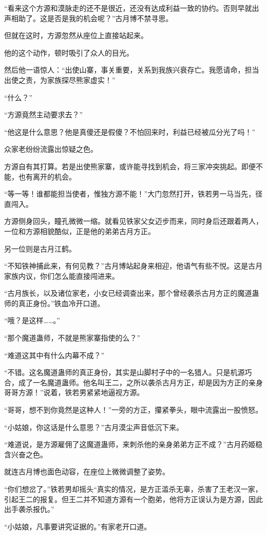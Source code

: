 \begin{this_body}
“看来这个方源和漠脉走的还不是很近，还没有达成利益一致的协约。否则早就出声相助了。这是否是我的机会呢？”古月博不禁寻思。

但就在这时，方源忽然从座位上直接站起来。

他的这个动作，顿时吸引了众人的目光。

然后他一语惊人：“出使山寨，事关重要，关系到我族兴衰存亡。我愿请命，担当出使之责，为家族探尽熊家虚实！”

“什么？”

“方源竟然主动要求去？”

“他这是什么意思？他是真傻还是假傻？不怕回来时，利益已经被瓜分光了吗！”

众家老纷纷流露出惊疑之色。

方源自有其打算。若是出使熊家寨，或许能寻找到机会，将三家冲突挑起。即便不能，也有离开的机会。

“等一等！谁都能担当使者，惟独方源不能！”大门忽然打开，铁若男一马当先，径直闯入。

方源侧身回头，瞳孔微微一缩。就看见铁家父女迈步而来，同时身后还跟着两人，一位和方源相貌酷似，正是他的弟弟古月方正。

另一位则是古月江鹤。

“不知铁神捕此来，有何见教？”古月博站起身来相迎，他语气有些不悦。这是古月家族内议，你们怎么能直接闯进来。

“古月族长，以及诸位家老，小女已经调查出来，那个曾经袭杀古月方正的魔道蛊师的真正身份。”铁血冷开口道。

“哦？是这样……。”

“那个魔道蛊师，不就是熊家寨指使的么？”

“难道这其中有什么内幕不成？”

“不错。这名魔道蛊师的真正身份，其实是山脚村子中的一名猎人。只是机源巧合，成了一名魔道蛊师。他名叫王二，之所以袭杀古月方正，却是因为方正的亲身哥哥方源！”说着，铁若男紧紧地逼视方源。

“哥哥，想不到你竟然是这种人！”一旁的方正，攥紧拳头，眼中流露出一股愤怒。

“小姑娘，你这话是什么意思？”古月漠尘声音低沉下来。

“难道说，是方源雇佣了这魔道蛊师，来刺杀他的亲身弟弟方正不成？”古月药姬稳含兴奋之色。

就连古月博也面色动容，在座位上微微调整了姿势。

“你们想岔了。”铁若男却摇头“真实的情况，是方正滥杀无辜，杀害了王老汉一家，引起王二的报复。但王二并不知道方源有一个胞弟，他将方正误认为是方源，因此出手袭杀报仇。”

“小姑娘，凡事要讲究证据的。”有家老开口道。


\end{this_body}
